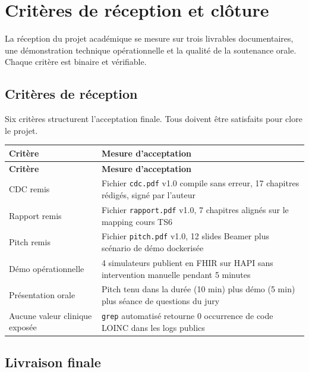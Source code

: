 \chapter{Critères de réception et clôture}
\label{ch:reception-cloture}

La réception du projet académique se mesure sur trois livrables documentaires, une démonstration technique opérationnelle et la qualité de la soutenance orale. Chaque critère est binaire et vérifiable.

\section{Critères de réception}
\label{sec:criteres-reception}

Six critères structurent l'acceptation finale. Tous doivent être satisfaits pour clore le projet.

\bridgezebra
\begin{longtable}{p{5cm}p{10cm}}
  \toprule
  \rowcolor{bridgeblue!90}
  {\color{white}\bfseries Critère} & {\color{white}\bfseries Mesure d'acceptation} \\
  \midrule
  \endfirsthead
  \toprule
  \rowcolor{bridgeblue!90}
  {\color{white}\bfseries Critère} & {\color{white}\bfseries Mesure d'acceptation} \\
  \midrule
  \endhead
  \bottomrule
  \endfoot
  CDC remis & Fichier \texttt{cdc.pdf} v1.0 compile sans erreur, 17 chapitres rédigés, signé par l'auteur \\
  Rapport remis & Fichier \texttt{rapport.pdf} v1.0, 7 chapitres alignés sur le mapping cours TS6 \\
  Pitch remis & Fichier \texttt{pitch.pdf} v1.0, 12 slides Beamer plus scénario de démo dockerisée \\
  Démo opérationnelle & 4 simulateurs publient en FHIR sur HAPI sans intervention manuelle pendant 5 minutes \\
  Présentation orale & Pitch tenu dans la durée (10 min) plus démo (5 min) plus séance de questions du jury \\
  Aucune valeur clinique exposée & \texttt{grep} automatisé retourne 0 occurrence de code LOINC dans les logs publics \\
\end{longtable}

\section{Livraison finale}
\label{sec:livraison-finale}

